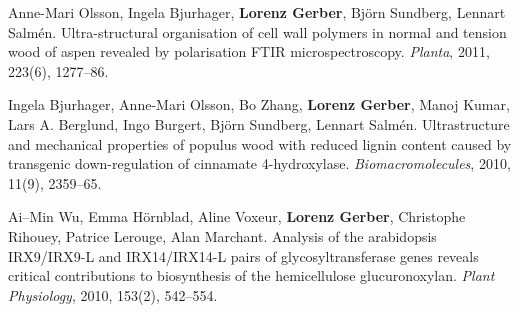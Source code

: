 \documentclass[10pt]{article}
\begin{document}
\begin{bibenum}
                                                                                           \item Anne-Mari Olsson, Ingela Bjurhager, \textbf{Lorenz Gerber},
                                                                                             Bj\"{o}rn Sundberg, Lennart Salm\'{e}n. Ultra-structural
                                                                                             organisation of cell wall polymers in normal and tension wood
                                                                                             of aspen revealed by polarisation FTIR microspectroscopy.
                                                                                             \emph{Planta}, 2011, 223(6), 1277--86.\\

                                                                                           \item Ingela Bjurhager, Anne-Mari Olsson, Bo Zhang,
                                                                                             \textbf{Lorenz Gerber}, Manoj Kumar, Lars A. Berglund,
                                                                                             Ingo Burgert, Bj\"{o}rn Sundberg, Lennart Salm\'{e}n.
                                                                                             Ultrastructure and mechanical properties of populus wood with
                                                                                             reduced lignin content caused by transgenic down-regulation of
                                                                                             cinnamate 4-hydroxylase. \emph{Biomacromolecules}, 2010, 11(9), 2359--65.\\

                                                                                           \item Ai--Min Wu, Emma H\"{o}rnblad, Aline Voxeur, \textbf{Lorenz Gerber},
                                                                                             Christophe Rihouey, Patrice Lerouge, Alan Marchant. Analysis
                                                                                             of the arabidopsis IRX9/IRX9-L and IRX14/IRX14-L pairs of
                                                                                             glycosyltransferase genes reveals critical contributions
                                                                                             to biosynthesis of the hemicellulose glucuronoxylan. \emph{Plant
                                                                                               Physiology}, 2010, 153(2), 542--554.\\


\end{bibenum}
\end{document}
